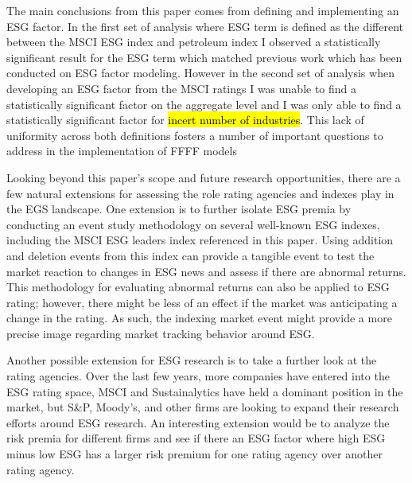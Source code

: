 The main conclusions from this paper comes from defining and  implementing an ESG factor.  In the first set of analysis where ESG term is defined as the different between the MSCI ESG index and petroleum index I observed a statistically significant result for the ESG term which matched previous work which has been conducted on ESG factor modeling. However in the second set of analysis when developing an ESG factor from the MSCI ratings I was unable to find a statistically significant factor on the aggregate level and I was only able to find a statistically significant factor for \hl{ incert number of industries}. This lack of uniformity across both definitions fosters a number of important questions to address in the implementation of FFFF models

Looking beyond this paper's scope and future research opportunities, there are a few natural extensions for assessing the role rating agencies and indexes play in the EGS landscape. One extension is to further isolate ESG premia by conducting an event study methodology on several well-known ESG indexes, including the MSCI ESG leaders index referenced in this paper. Using addition and deletion events from this index can provide a tangible event to test the market reaction to changes in ESG news and assess if there are abnormal returns. This methodology for evaluating abnormal returns can also be applied to ESG rating; however, there might be less of an effect if the market was anticipating a change in the rating. As such, the indexing market event might provide a more precise image regarding market tracking behavior around ESG.

Another possible extension for ESG research is to take a further look at the rating agencies. Over the last few years, more companies have entered into the ESG rating space, MSCI and Sustainalytics have held a dominant position in the market, but S\&P, Moody's, and other firms are looking to expand their research efforts around ESG research. An interesting extension would be to analyze the risk premia for different firms and see if there an ESG factor where high ESG minus low ESG has a larger risk premium for one rating agency over another rating agency.
